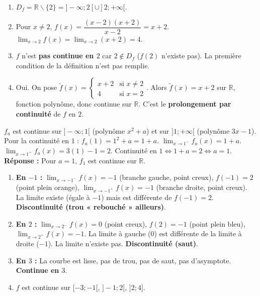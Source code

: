 \documentclass[11pt]{article}
\def\setminus{\mathbin{\backslash}}\let\smallsetminus\setminus
\begin{document}
\begin{corrige}[Exercice 1]
\begin{enumerate}
    \item $D_f = \mathbb{R} \setminus \{2\} = ]-\infty;2[ \cup ]2;+\infty[$.
    \item Pour $x \neq 2$, $f(x) = \dfrac{(x-2)(x+2)}{x-2} = x+2$.
          $\lim_{x \to 2} f(x) = \lim_{x \to 2} (x+2) = 4$.
    \item $f$ n'est \textbf{pas continue en $2$} car $2 \notin D_f$ ($f(2)$ n'existe pas). La première condition de la définition n'est pas remplie.
    \item Oui. On pose $\tilde{f}(x) = \begin{cases} x+2 & \text{si } x \neq 2 \\ 4 & \text{si } x = 2 \end{cases}$.
          Alors $\tilde{f}(x) = x+2$ sur $\mathbb{R}$, fonction polynôme, donc continue sur $\mathbb{R}$.
          C'est le \textbf{prolongement par continuité} de $f$ en $2$.
\end{enumerate}
\end{corrige}

\begin{corrige}[Exercice 2]
$f_a$ est continue sur $]-\infty;1[$ (polynôme $x^2+a$) et sur $]1;+\infty[$ (polynôme $3x-1$).
Pour la continuité en $1$ :
$f_a(1) = 1^2 + a = 1+a$.
$\lim_{x \to 1^-} f_a(x) = 1+a$.
$\lim_{x \to 1^+} f_a(x) = 3(1)-1 = 2$.
Continuité en $1 \iff 1+a = 2 \iff a = 1$.
\textbf{Réponse :} Pour $a=1$, $f_1$ est continue sur $\mathbb{R}$.
\end{corrige}

\begin{corrige}[Exercice 3]
\begin{enumerate}
    \item \textbf{En $-1$ :} $\lim_{x \to -1^-} f(x) = -1$ (branche gauche, point creux), $f(-1)=2$ (point plein orange), $\lim_{x \to -1^+} f(x) = -1$ (branche droite, point creux).
          La limite existe (égale à $-1$) mais est différente de $f(-1)=2$. \textbf{Discontinuité (trou « rebouché » ailleurs)}.
    \item \textbf{En $2$ :} $\lim_{x \to 2^-} f(x) = 0$ (point creux), $f(2) = -1$ (point plein bleu), $\lim_{x \to 2^+} f(x) = -1$.
          La limite à gauche ($0$) est différente de la limite à droite ($-1$). La limite n'existe pas. \textbf{Discontinuité (saut)}.
    \item \textbf{En $3$ :} La courbe est lisse, pas de trou, pas de saut, pas d'asymptote. \textbf{Continue en $3$}.
    \item $f$ est continue sur $[-3;-1[$, $]-1;2[$, $]2;4]$.
\end{enumerate}
\end{corrige}
\end{document}
